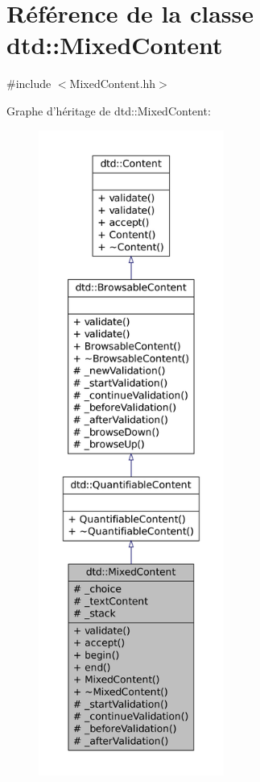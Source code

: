 \hypertarget{classdtd_1_1_mixed_content}{
\section{Référence de la classe dtd::MixedContent}
\label{classdtd_1_1_mixed_content}
}


{\ttfamily \#include $<$MixedContent.hh$>$}



Graphe d'héritage de dtd::MixedContent:\nopagebreak
\begin{figure}[H]
\begin{center}
\leavevmode
\includegraphics[height=600pt]{classdtd_1_1_mixed_content__inherit__graph}
\end{center}
\end{figure}


